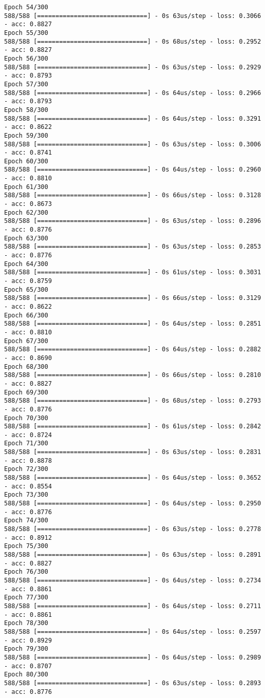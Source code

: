 \documentclass[11pt]{article}
\begin{document}
\begin{Verbatim}[commandchars=\\\{\}]
Epoch 54/300
588/588 [==============================] - 0s 63us/step - loss: 0.3066 - acc: 0.8827
Epoch 55/300
588/588 [==============================] - 0s 68us/step - loss: 0.2952 - acc: 0.8827
Epoch 56/300
588/588 [==============================] - 0s 63us/step - loss: 0.2929 - acc: 0.8793
Epoch 57/300
588/588 [==============================] - 0s 64us/step - loss: 0.2966 - acc: 0.8793
Epoch 58/300
588/588 [==============================] - 0s 64us/step - loss: 0.3291 - acc: 0.8622
Epoch 59/300
588/588 [==============================] - 0s 63us/step - loss: 0.3006 - acc: 0.8741
Epoch 60/300
588/588 [==============================] - 0s 64us/step - loss: 0.2960 - acc: 0.8810
Epoch 61/300
588/588 [==============================] - 0s 66us/step - loss: 0.3128 - acc: 0.8673
Epoch 62/300
588/588 [==============================] - 0s 63us/step - loss: 0.2896 - acc: 0.8776
Epoch 63/300
588/588 [==============================] - 0s 63us/step - loss: 0.2853 - acc: 0.8776
Epoch 64/300
588/588 [==============================] - 0s 61us/step - loss: 0.3031 - acc: 0.8759
Epoch 65/300
588/588 [==============================] - 0s 66us/step - loss: 0.3129 - acc: 0.8622
Epoch 66/300
588/588 [==============================] - 0s 64us/step - loss: 0.2851 - acc: 0.8810
Epoch 67/300
588/588 [==============================] - 0s 64us/step - loss: 0.2882 - acc: 0.8690
Epoch 68/300
588/588 [==============================] - 0s 66us/step - loss: 0.2810 - acc: 0.8827
Epoch 69/300
588/588 [==============================] - 0s 68us/step - loss: 0.2793 - acc: 0.8776
Epoch 70/300
588/588 [==============================] - 0s 61us/step - loss: 0.2842 - acc: 0.8724
Epoch 71/300
588/588 [==============================] - 0s 63us/step - loss: 0.2831 - acc: 0.8878
Epoch 72/300
588/588 [==============================] - 0s 64us/step - loss: 0.3652 - acc: 0.8554
Epoch 73/300
588/588 [==============================] - 0s 64us/step - loss: 0.2950 - acc: 0.8776
Epoch 74/300
588/588 [==============================] - 0s 63us/step - loss: 0.2778 - acc: 0.8912
Epoch 75/300
588/588 [==============================] - 0s 63us/step - loss: 0.2891 - acc: 0.8827
Epoch 76/300
588/588 [==============================] - 0s 64us/step - loss: 0.2734 - acc: 0.8861
Epoch 77/300
588/588 [==============================] - 0s 64us/step - loss: 0.2711 - acc: 0.8861
Epoch 78/300
588/588 [==============================] - 0s 64us/step - loss: 0.2597 - acc: 0.8929
Epoch 79/300
588/588 [==============================] - 0s 64us/step - loss: 0.2989 - acc: 0.8707
Epoch 80/300
588/588 [==============================] - 0s 63us/step - loss: 0.2893 - acc: 0.8776

\end{Verbatim}
\end{document}
